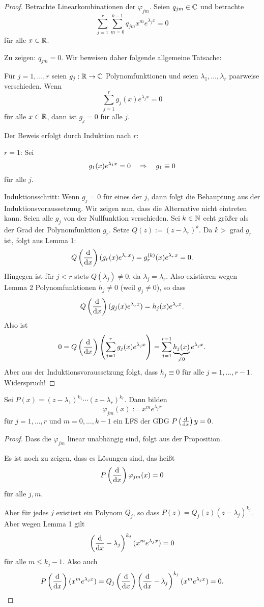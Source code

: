\begin{proof}
  Betrachte Linearkombinationen der $\varphi_{jm}$. Seien $q_{jm} \in \mathbb{C}$
  und betrachte
  \[ \sum_{j=1}^r \sum_{m=0}^{k-1} q_{jm} x^m e^{\lambda_j x} = 0 \]
  für alle $x \in \mathbb{R}$.

  Zu zeigen: $q_{jm} = 0$. Wir beweisen daher folgende allgemeine Tatsache:

  Für $j = 1, \ldots, r$ seien $g_j: \mathbb{R}  \to \mathbb{C}$ Polynomfunktionen und
  seien $\lambda_1, \ldots, \lambda_r$ paarweise verschieden. Wenn
  \[ \sum_{j=1}^r g_j(x) e^{\lambda_j x} = 0 \]
  für alle $x \in \mathbb{R}$, dann ist $g_j = 0$ für alle $j$.

  Der Beweis erfolgt durch Induktion nach $r$:

  $r=1$: Sei
  \[ g_1(x) e^{\lambda_1 x} = 0 \quad \Rightarrow \quad g_1 \equiv 0 \]
  für alle $j$.

  Induktionsschritt: Wenn $g_j = 0$ für eines der $j$, dann folgt die
  Behauptung aus der Induktionsvoraussetzung. Wir zeigen nun, dass die
  Alternative nicht eintreten kann. Seien alle $g_j$ von der Nullfunktion
  verschieden. Sei $k \in \mathbb{N}$ echt größer als der Grad der Polynomfunktion
  $g_r$. Setze $Q(z) := (z - \lambda_r)^k$. Da $k > \operatorname{grad} g_r$
  ist, folgt aus Lemma 1:
  \[ Q \left( \frac{\mathrm{d} }{\mathrm{d} x} \right) (g_r(x) e^{\lambda_r x}) = g_r^{(k)}(x)
    e^{\lambda_r x} = 0. \]
  Hingegen ist für $j < r$ stets $Q(\lambda_j) \ne 0$, da $\lambda_j =
  \lambda_r$. Also existieren wegen Lemma 2 Polynomfunktionen $h_j \ne 0$ (weil
  $g_j \ne 0$), so dass
  \[ Q\left( \frac{\mathrm{d} }{\mathrm{d} x} \right) (g_j(x) e^{\lambda_j x}) = h_j(x) e^{\lambda_j
      x}. \]
  Also ist
  \[ 0 = Q\left( \frac{\mathrm{d} }{\mathrm{d} x} \right) \left( \sum_{j=1}^r g_j(x) e^{\lambda_j x}
    \right) = \sum_{j=1}^{r-1} \underbrace{h_j(x)}_{\ne 0} e^{\lambda_j x}. \]
  Aber aus der Induktionsvoraussetzung folgt, dass $h_j \equiv 0$ für alle
  $j=1,\ldots,r-1$. Widerspruch!
\end{proof}

\begin{thm}
  Sei $P(x) = (z- \lambda_1)^{k_1} \cdots (z - \lambda_r)^{k_r}$. Dann bilden
  \[ \varphi_{jm}(x) := x^m e^{\lambda_j x} \]
  für $j=1, \ldots, r$ und $m=0, \ldots,k-1$ ein LFS der GDG $P\left( \frac{\mathrm{d} }{\mathrm{d} x}
  \right) y = 0$.
\end{thm}

\begin{proof}
  Dass die $\varphi_{jm}$ linear unabhängig sind, folgt aus der Proposition.

  Es ist noch zu zeigen, dass es Lösungen sind, das heißt
  \[ P \left(  \frac{\mathrm{d} }{\mathrm{d} x} \right) \varphi_{jm}(x) = 0 \]
  für alle $j,m$.

  Aber für jedes $j$ existiert ein Polynom $Q_j$, so dass $P(z) = Q_j(z)(z -
  \lambda_j)^{k_j}$. Aber wegen Lemma 1 gilt
  \[ \left( \frac{\mathrm{d} }{\mathrm{d} x} - \lambda_j \right)^{k_j} (x^m e^{\lambda_j x}) = 0\]
  für alle $m \le k_j-1$. Also auch
  \[ P \left( \frac{\mathrm{d} }{\mathrm{d} x} \right) (x^m e^{\lambda_j x}) =
    Q_j \left( \frac{\mathrm{d} }{\mathrm{d} x} \right) \left( \frac{\mathrm{d} }{\mathrm{d} x} - \lambda_j \right)^{k_j}
    (x^m e^{\lambda_j x}) = 0. \qedhere\]
\end{proof}


